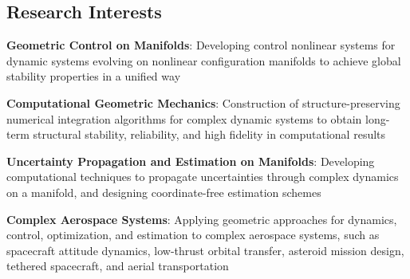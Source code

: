 \documentclass[10pt]{article}
\begin{document}
\subsection*{Research Interests}
\begin{list}{}%
{\setlength{\leftmargin}{1.0cm}\setlength{\itemindent}{-0.5cm}
\setlength{\parsep}{0cm}\setlength{\itemsep}{0.12cm}\setlength{\parskip}{0cm}\setlength{\topsep}{0cm}\setlength{\partopsep}{0cm}}

\item \textbf{Geometric Control on Manifolds}: Developing control nonlinear systems for dynamic systems evolving on nonlinear configuration manifolds to achieve global stability properties in a unified way


\item \textbf{Computational Geometric Mechanics}: Construction of structure-preserving numerical integration algorithms for complex dynamic systems to obtain long-term structural stability, reliability, and high fidelity in computational results


\item \textbf{Uncertainty Propagation and Estimation on Manifolds}: Developing computational techniques to propagate uncertainties through complex dynamics on a manifold, and designing coordinate-free estimation schemes

\vspace*{0.2cm}





\item \textbf{Complex Aerospace Systems}: Applying geometric approaches for dynamics, control, optimization, and estimation to complex aerospace systems, such as spacecraft attitude dynamics, low-thrust orbital transfer, asteroid mission design, tethered spacecraft, and aerial transportation


\end{list}
\end{document}

